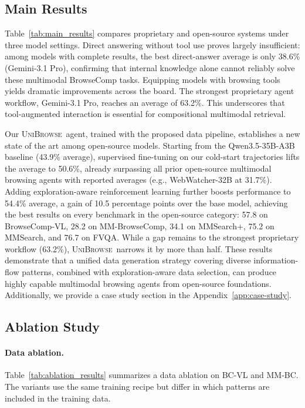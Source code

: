 \documentclass[11pt]{article}
\newcommand{\modelname}{\textsc{UniBrowse}}
\begin{document}
\subsection{Main Results}

Table~\ref{tab:main_results} compares proprietary and open-source systems under three model settings.
Direct answering without tool use proves largely insufficient: among models with complete results, the best direct-answer average is only 38.6\% (Gemini-3.1 Pro), confirming that internal knowledge alone cannot reliably solve these multimodal BrowseComp tasks. 
Equipping models with browsing tools yields dramatic improvements across the board. 
The strongest proprietary agent workflow, Gemini-3.1 Pro, reaches an average of 63.2\%.
This underscores that tool-augmented interaction is essential for compositional multimodal retrieval.

Our \modelname\ agent, trained with the proposed data pipeline, establishes a new state of the art among open-source models. 
Starting from the Qwen3.5-35B-A3B baseline (43.9\% average), supervised fine-tuning on our cold-start trajectories lifts the average to 50.6\%, already surpassing all prior open-source multimodal browsing agents with reported averages (e.g., WebWatcher-32B at 31.7\%). 
Adding exploration-aware reinforcement learning further boosts performance to 54.4\% average, a gain of 10.5 percentage points over the base model, achieving the best results on every benchmark in the open-source category: 57.8 on BrowseComp-VL, 28.2 on MM-BrowseComp, 34.1 on MMSearch+, 75.2 on MMSearch, and 76.7 on FVQA.
While a gap remains to the strongest proprietary workflow (63.2\%), \modelname\ narrows it by more than half.
These results demonstrate that a unified data generation strategy covering diverse information-flow patterns, combined with exploration-aware data selection, can produce highly capable multimodal browsing agents from open-source foundations. Additionally, we provide a case study section in the Appendix~\ref{app:case-study}.

\subsection{Ablation Study}

\paragraph{Data ablation.}
Table~\ref{tab:ablation_results} summarizes a data ablation on BC-VL and MM-BC. The variants use the same training recipe but differ in which patterns are included in the training data.
\end{document}
